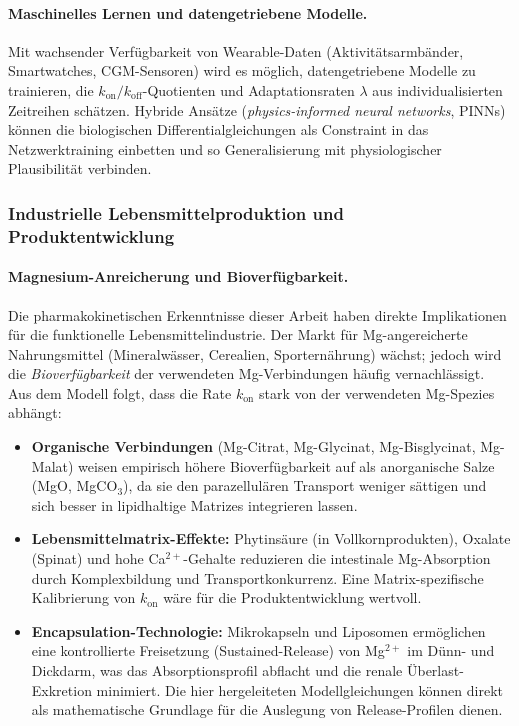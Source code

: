 ﻿\documentclass[12pt,a4paper]{article}
\theoremstyle{plain}
\theoremstyle{definition}
\theoremstyle{remark}
\begin{document}
\paragraph{Maschinelles Lernen und datengetriebene Modelle.}
Mit wachsender Verfügbarkeit von Wearable-Daten (Aktivitätsarmbänder,
Smartwatches, CGM-Sensoren) wird es möglich, datengetriebene Modelle
zu trainieren, die $k_\text{on}/k_\text{off}$-Quotienten und
Adaptationsraten $\lambda$ aus individualisierten Zeitreihen schätzen.
Hybride Ansätze (\emph{physics-informed neural networks}, PINNs) können
die biologischen Differentialgleichungen als Constraint in das
Netzwerktraining einbetten und so Generalisierung mit physiologischer
Plausibilität verbinden.

\subsubsection{Industrielle Lebensmittelproduktion und Produktentwicklung}

\paragraph{Magnesium-Anreicherung und Bioverfügbarkeit.}
Die pharmakokinetischen Erkenntnisse dieser Arbeit haben direkte Implikationen
für die funktionelle Lebensmittelindustrie. Der Markt für
Mg-angereicherte Nahrungsmittel (Mineralwässer, Cerealien, Sporternährung)
wächst; jedoch wird die \emph{Bioverfügbarkeit} der verwendeten Mg-Verbindungen
häufig vernachlässigt. Aus dem Modell folgt, dass die Rate $k_\text{on}$
stark von der verwendeten Mg-Spezies abhängt:
\begin{itemize}
  \item \textbf{Organische Verbindungen} (Mg-Citrat, Mg-Glycinat,
        Mg-Bisglycinat, Mg-Malat) weisen empirisch höhere Bioverfügbarkeit
        auf als anorganische Salze (MgO, MgCO$_3$), da sie den
        parazellulären Transport weniger sättigen und sich besser in
        lipidhaltige Matrizes integrieren lassen.
  \item \textbf{Lebensmittelmatrix-Effekte:} Phytinsäure (in Vollkornprodukten),
        Oxalate (Spinat) und hohe Ca$^{2+}$-Gehalte reduzieren die intestinale
        Mg-Absorption durch Komplexbildung und Transportkonkurrenz. Eine
        Matrix-spezifische Kalibrierung von $k_\text{on}$ wäre für die
        Produktentwicklung wertvoll.
  \item \textbf{Encapsulation-Technologie:} Mikrokapseln und Liposomen
        ermöglichen eine kontrollierte Freisetzung (Sustained-Release) von
        Mg$^{2+}$ im Dünn- und Dickdarm, was das Absorptionsprofil abflacht
        und die renale Überlast-Exkretion minimiert. Die hier hergeleiteten
        Modellgleichungen können direkt als mathematische Grundlage für die
        Auslegung von Release-Profilen dienen.
\end{itemize}
\end{document}
